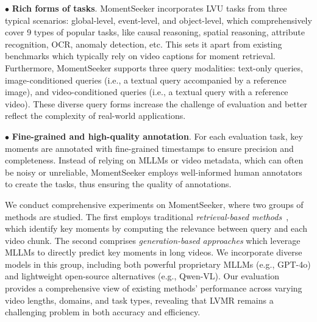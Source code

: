 \documentclass{article}
\begin{document}
$\bullet$ \textbf{Rich forms of tasks}. MomentSeeker incorporates LVU tasks from three typical scenarios: global-level, event-level, and object-level, which comprehensively cover 9 types of popular tasks, like causal reasoning, spatial reasoning, attribute recognition, OCR, anomaly detection, etc. This sets it apart from existing benchmarks which typically rely on video captions for moment retrieval. Furthermore, MomentSeeker supports three query modalities: text-only queries, image-conditioned queries (i.e., a textual query accompanied by a reference image), and video-conditioned queries (i.e., a textual query with a reference video). These diverse query forms increase the challenge of evaluation and better reflect the complexity of real-world applications. 



$\bullet$ \textbf{Fine-grained and high-quality annotation}. For each evaluation task, key moments are annotated with fine-grained timestamps to ensure precision and completeness. Instead of relying on MLLMs or video metadata, which can often be noisy or unreliable, MomentSeeker employs well-informed human annotators to create the tasks, thus ensuring the quality of annotations.  


We conduct comprehensive experiments on MomentSeeker, where two groups of methods are studied. The first employs traditional \textit{retrieval-based methods}~\cite{wei2025uniir,zhu2023languagebind}, which identify key moments by computing the relevance between query and each video chunk. The second comprises \textit{generation-based approaches} which leverage MLLMs to directly predict key moments in long videos. We incorporate diverse models in this group, including both powerful proprietary MLLMs (e.g., GPT-4o) and lightweight open-source alternatives (e.g., Qwen-VL). Our evaluation provides a comprehensive view of existing methods' performance across varying video lengths, domains, and task types, revealing that LVMR remains a challenging problem in both accuracy and efficiency. 
\end{document}
